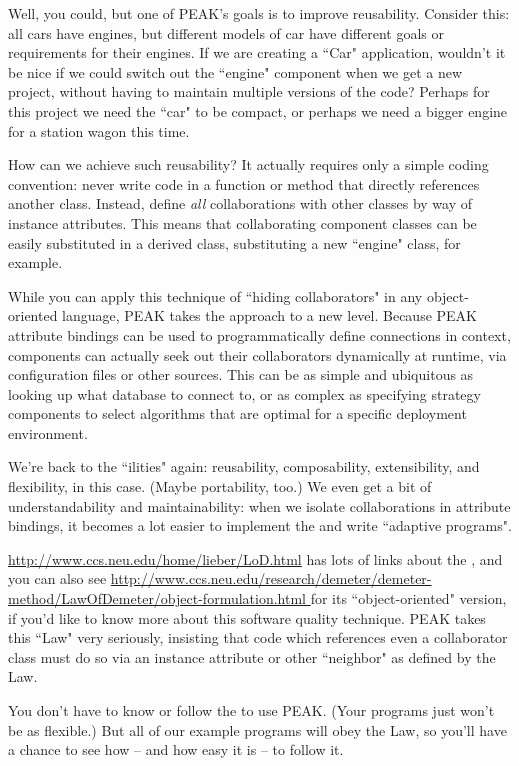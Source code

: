 Well, you could, but one of PEAK's goals is to improve reusability.  Consider
this: all cars have engines, but different models of car have different goals
or requirements for their engines.  If we are creating a ``Car" application,
wouldn't it be nice if we could switch out the ``engine" component when we
get a new project, without having to maintain multiple versions of the code?
Perhaps for this project we need the ``car" to be compact, or perhaps we need
a bigger engine for a station wagon this time.

How can we achieve such reusability?  It actually requires only a simple
coding convention: never write code in a function or method that directly
references another class.  Instead, define \emph{all} collaborations with
other classes by way of instance attributes.  This means that collaborating
component classes can be easily substituted in a derived class, substituting
a new ``engine" class, for example.






While you can apply this technique of ``hiding collaborators" in any
object-oriented language, PEAK takes the approach to a new level.  Because
PEAK attribute bindings can be used to programmatically define connections in
context, components can actually seek out their collaborators dynamically at
runtime, via configuration files or other sources.  This can be as simple
and ubiquitous as looking up what database to connect to, or as complex as
specifying strategy components to select algorithms that are optimal
for a specific deployment environment.

We're back to the ``ilities" again: reusability, composability, extensibility,
and flexibility, in this case.  (Maybe portability, too.)  We even get a bit
of understandability and maintainability: when we isolate collaborations in
attribute bindings, it becomes a lot easier to implement the  and write ``adaptive programs".

\vfill

\begin{seealso}

\url{http://www.ccs.neu.edu/home/lieber/LoD.html} has lots of links about the 
, and you can also see
\url{http://www.ccs.neu.edu/research/demeter/demeter-method/LawOfDemeter/object-formulation.html
} for its ``object-oriented" version, if you'd like to know more about this
software quality technique.  PEAK takes this ``Law" very seriously, insisting
that code which references even a collaborator class must do so via an
instance attribute or other ``neighbor" as defined by the Law.

You don't have to know or follow the  to use PEAK.
(Your programs just won't be as flexible.)  But all of our example programs 
will obey the Law, so you'll have a chance to see how -- and how easy it 
is -- to follow it.

\end{seealso}

